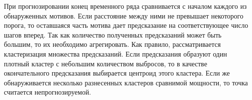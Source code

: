 При прогнозировании конец временного ряда сравнивается с началом каждого из обнаруженных мотивов.
Если расстояние между ними не превышает некоторого порога, то оставшаяся часть мотива дает предсказание на соответствующее число шагов вперед.
Так как количество полученных предсказаний может быть большим, то их необходимо агрегировать.
Как правило, рассматривается кластеризация множества предсказаний.
Если предсказания образуют один плотный кластер с небольшим количеством выбросов, то в качестве окончательного предсказания выбирается центроид этого кластера.
Если же обнаруживается несколько разнесенных кластеров сравнимой мощности, то точка считается непрогнозируемой.

